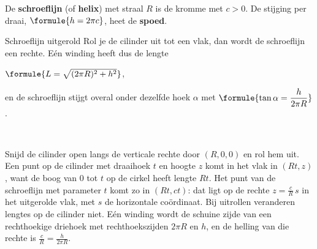 \begin{theorie}
De \textbf{\textcolor{accent}{schroeflijn}} (of \textbf{\textcolor{accent}{helix}}) met straal $R$ is de kromme
met $c > 0$. De stijging per draai, $\formule{h = 2\pi c}$, heet de \textbf{\textcolor{accent}{spoed}}.

\begin{minipage}[t]{.6\linewidth}
\vspace{0pt}
\begin{stelling}{Schroeflijn uitgerold}
Rol je de cilinder uit tot een vlak, dan wordt de schroeflijn een rechte. Eén winding heeft dus de lengte

\vspace{1mm}
\qquad $\formule{L = \sqrt{(2\pi R)^2 + h^2}}$,

\vspace{1mm}
en de schroeflijn stijgt overal onder dezelfde hoek $\alpha$ met $\formule{\tan\alpha = \dfrac{h}{2\pi R}}$.
\end{stelling}
\end{minipage}\hfill
\begin{minipage}[t]{.36\linewidth}
\vspace{0pt}
\centering
{}\ 
\end{minipage}

\begin{bewijs}
Snijd de cilinder open langs de verticale rechte door $(R, 0, 0)$ en rol hem uit. Een punt op de cilinder met draaihoek $t$ en hoogte $z$ komt in het vlak in $(Rt, z)$, want de boog van $0$ tot $t$ op de cirkel heeft lengte $Rt$. Het punt van de schroeflijn met parameter $t$ komt zo in $(Rt, ct)$: dat ligt op de rechte $z = \tfrac{c}{R}\,s$ in het uitgerolde vlak, met $s$ de horizontale coördinaat. Bij uitrollen veranderen lengtes op de cilinder niet. Eén winding wordt de schuine zijde van een rechthoekige driehoek met rechthoekszijden $2\pi R$ en $h$, en de helling van die rechte is $\tfrac{c}{R} = \tfrac{h}{2\pi R}$.
\end{bewijs}
\end{theorie}

